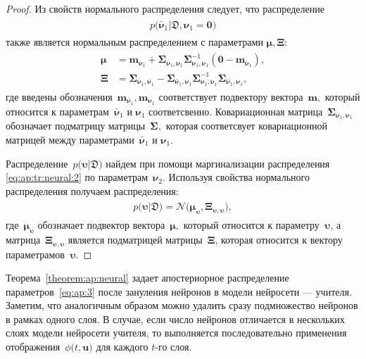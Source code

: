 \documentclass[12pt]{a&t}
\begin{document}
\begin{proof}
Из свойств нормального распределения следует, что распределение
\begin{gather}
\label{eq:ap:tr:neural:2}
\begin{aligned}
p\bigr(\bar{\bm{\nu}}_1|\mathfrak{D}, \bm{\nu}_1=\mathbf{0}\bigr)
\end{aligned}
\end{gather}
также является нормальным распределением с параметрами $\bm{\mu}, \bm{\Xi}$:
\begin{gather}
\label{eq:ap:tr:1:1}
\begin{aligned}
\bm{\mu} &= \mathbf{m}_{\bar{\bm{\nu}}_1}+\bm{\Sigma}_{\bar{\bm{\nu}}_1,\bm{\nu}_1} \bm{\Sigma}_{\bm{\nu}_1,\bm{\nu}_1}^{-1} \left(\mathbf{0} - \mathbf{m}_{\bm{\nu}_1}\right), \\
 \bm{\Xi} &= \bm{\Sigma}_{\bar{\bm{\nu}}_1,\bar{\bm{\nu}}_1} - \bm{\Sigma}_{\bar{\bm{\nu}}_1,\bm{\nu}_1} \bm{\Sigma}_{\bm{\nu}_1,\bm{\nu}_1}^{-1} \bm{\Sigma}_{\bar{\bm{\nu}}_1,\bm{\nu}_1},
\end{aligned}
\end{gather}
где введены обозначения~$\mathbf{m}_{\bar{\bm{\nu}}_1}, \mathbf{m}_{\bm{\nu}_1}$ соответствует подвектору вектора~$\mathbf{m},$ который относится к параметрам~$\bar{\bm{\nu}}_1$ и $\bm{\nu}_1$ соответсвенно. Ковариационная матрица~$\bm{\Sigma}_{\bar{\bm{\nu}}_1,\bm{\nu}_1}$ обозначает подматрицу матрицы~$\bm{\Sigma},$ которая соответсвует ковариационной матрицей между параметрами~$\bar{\bm{\nu}}_1$ и $\bm{\nu}_1.$

Распределение~$p\bigr(\bm{\upsilon}|\mathfrak{D}\bigr)$ найдем при помощи маргинализации распределения \eqref{eq:ap:tr:neural:2} по параметрам~$\bm{\nu}_2.$ Используя свойства нормального распределения получаем распределения:
\begin{gather}
\label{eq:ap:3}
\begin{aligned}
p\bigr(\bm{\upsilon}|\mathfrak{D}\bigr) = \mathcal{N}\bigr(\bm{\mu}_{\bm{\upsilon}},  \bm{\Xi}_{\bm{\upsilon}, \bm{\upsilon}}\bigr),
\end{aligned}
\end{gather}
где~$\bm{\mu}_{\bm{\upsilon}}$ обозначает подвектор вектора~$\bm{\mu},$ который относится к параметру~$\bm{\upsilon}$, а матрица~$\bm{\Xi}_{\bm{\upsilon}, \bm{\upsilon}}$ является подматрицей матрицы~$\bm{\Xi}$, которая относится к вектору параметрамов~$\bm{\upsilon}.$
\end{proof}

Теорема~\ref{theorem:ap:neural} задает апостериорное распределение параметров~\eqref{eq:ap:3} после зануления нейронов в модели нейросети --- учителя. Заметим, что аналогичным образом можно удалить сразу подмножество нейронов в рамках одного слоя. В случае, если число нейронов отличается в нескольких слоях модели нейросети учителя, то выполняется последовательно применения отображения~$\phi\bigr(t, \mathbf{u}\bigr)$ для каждого $t$-го слоя.
\end{document}
